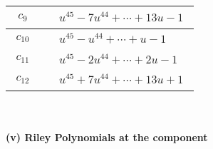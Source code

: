 \documentclass[1p]{elsarticle_modified}
\theoremstyle{definition}
\begin{document}
\begin{tabular}{m{50pt}|m{274pt}}
\hline $$\begin{aligned}c_{9}\end{aligned}$$&$\begin{aligned}
&u^{45}-7 u^{44}+\cdots+13 u-1
\end{aligned}$\\
\hline $$\begin{aligned}c_{10}\end{aligned}$$&$\begin{aligned}
&u^{45}- u^{44}+\cdots+u-1
\end{aligned}$\\
\hline $$\begin{aligned}c_{11}\end{aligned}$$&$\begin{aligned}
&u^{45}-2 u^{44}+\cdots+2 u-1
\end{aligned}$\\
\hline $$\begin{aligned}c_{12}\end{aligned}$$&$\begin{aligned}
&u^{45}+7 u^{44}+\cdots+13 u+1
\end{aligned}$\\
\hline
\end{tabular}\\~\\
\newpage\renewcommand{\arraystretch}{1}
\flushleft \textbf{(v) Riley Polynomials at the component}\newline \\
\end{document}
